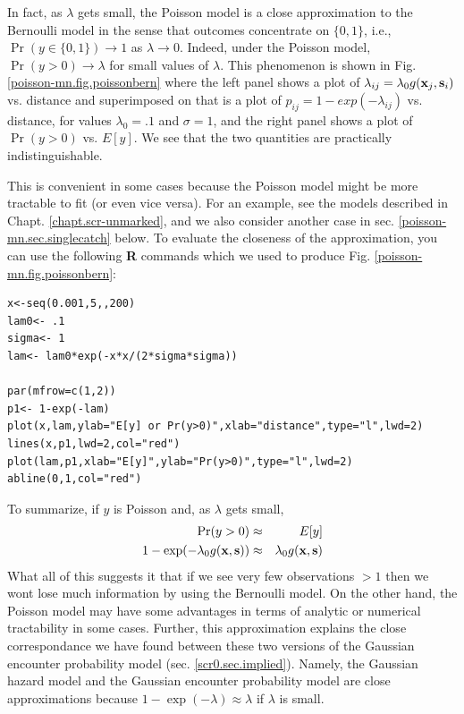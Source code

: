 In fact, as $\lambda$ gets small, the Poisson model is a close
approximation to the Bernoulli model in the sense that outcomes
concentrate on $\{0,1\}$, i.e., $\Pr(y\in \{0,1\}) \rightarrow 1$ as
$\lambda \rightarrow 0$.  Indeed, under the Poisson model, 
$\Pr(y>0) \rightarrow \lambda$ for small values of $\lambda$.
This phenomenon is shown in Fig.  \ref{poisson-mn.fig.poissonbern}
where the left panel shows a plot of $\lambda_{ij}=\lambda_{0}g({\bf
  x}_{j},{\bf s}_{i})$ vs. distance and superimposed on that is
a plot of $p_{ij}=1-exp(-\lambda_{ij})$ vs. distance, for values
$\lambda_{0} = .1$ and $\sigma = 1$, and the right panel shows a plot
of $\Pr(y>0)$ vs. $E[y]$. We see that the two quantities are
practically indistinguishable.

This is convenient in some cases because the Poisson model might be
more tractable to fit (or even vice versa). For an example, see the
models described in Chapt. \ref{chapt.scr-unmarked}, and we also
consider another case in sec. \ref{poisson-mn.sec.singlecatch}
below. To evaluate the closeness of the approximation, you can use the
following {\bf R} commands which we used to produce
Fig. \ref{poisson-mn.fig.poissonbern}: {\small
\begin{verbatim}
x<-seq(0.001,5,,200)
lam0<- .1
sigma<- 1
lam<- lam0*exp(-x*x/(2*sigma*sigma))

par(mfrow=c(1,2))
p1<- 1-exp(-lam)
plot(x,lam,ylab="E[y] or Pr(y>0)",xlab="distance",type="l",lwd=2)
lines(x,p1,lwd=2,col="red")
plot(lam,p1,xlab="E[y]",ylab="Pr(y>0)",type="l",lwd=2)
abline(0,1,col="red")
\end{verbatim}
}

To summarize, if $y$ is Poisson and, as $\lambda$ gets small,
\begin{eqnarray*}
\Pr(y>0)  & \approx & E[y]  \\
1-\exp(-\lambda_{0} g({\bf x},{\bf s})) &\approx &  \lambda_{0} g({\bf
  x},{\bf s})
\end{eqnarray*}
What all of this suggests it that if
we see very few observations $>1$ then we wont lose much information
by using the Bernoulli model. On the other hand, the Poisson model may
have some advantages in terms of analytic or numerical tractability in
some cases. Further, this approximation
 explains the close correspondance we have found between these
two versions of the Gaussian encounter probability model
(sec. \ref{scr0.sec.implied}).  Namely, the Gaussian hazard model and
the Gaussian encounter probability model are close approximations
because
$1-\exp(-\lambda) \approx \lambda$ if $\lambda$ is small.



